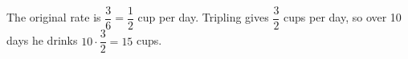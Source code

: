 The original rate is $\dfrac{3}{6}=\dfrac{1}{2}$ cup per day. Tripling gives $\dfrac{3}{2}$ cups per day, so over 10 days he drinks $10\cdot\dfrac{3}{2}=\boxed{15}$ cups.
